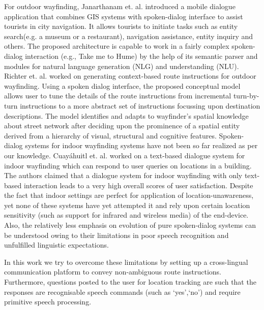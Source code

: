 \documentclass{iitkthesis}
\begin{document}
For outdoor wayfinding, Janarthanam et. al. \cite{janarthanam} introduced a mobile dialogue application that combines GIS systems with spoken-dialog interface to assist tourists in city navigation. It allows tourists to initiate tasks such as entity search(e.g. a museum or a restaurant), navigation assistance, entity inquiry and others. The proposed architecture is capable to work in a fairly complex spoken-dialog interaction (e.g., Take me to Hume) by the help of its semantic parser and  modules for natural language generation (NLG) and understanding (NLU). Richter et. al. \cite{richter} worked on generating context-based route instructions for outdoor wayfinding. Using a spoken dialog interface, the proposed conceptual model allows user to tune the details of the route instructions from incremental turn-by-turn instructions to a more abstract set of instructions focussing upon destination descriptions. The model identifies and adapts to wayfinder's spatial knowledge about street network after deciding upon the prominence of a spatial entity derived from a hierarchy of visual, structural and cognitive features. Spoken-dialog systems for indoor wayfinding systems have not been so far realized as per our knowledge. Cuay\'{a}huitl et. al. \cite{heriberto} worked on a text-based dialogue system for indoor wayfinding which can respond to user queries on locations in a building. The authors claimed that a dialogue system for indoor wayfinding with only text-based interaction leads to a very high overall scores of user satisfaction. Despite the fact that indoor settings are perfect for application of location-unawareness, yet none of these systems have yet attempted it and rely upon certain location sensitivity (such as support for infrared and wireless media) of the end-device. Also, the relatively less emphasis on evolution of pure spoken-dialog systems can be understood owing to their limitations in poor speech recognition and unfulfilled linguistic expectations. 

In this work we try to overcome these limitations by setting up a cross-lingual communication platform to convey non-ambiguous route instructions. Furthermore, questions posted to the user for location tracking are such that the responses are recognisable speech commands (such as `yes',`no') and require primitive speech processing. 
\end{document}
